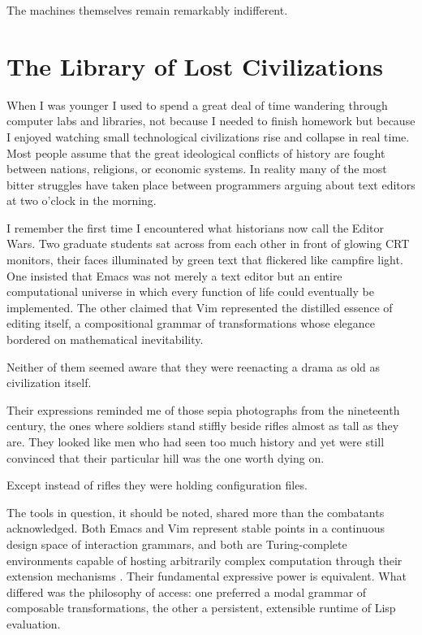 \documentclass[12pt]{article}
\theoremstyle{definition}
\begin{document}
The machines themselves remain remarkably indifferent.

\section{The Library of Lost Civilizations}

When I was younger I used to spend a great deal of time wandering through
computer labs and libraries, not because I needed to finish homework but
because I enjoyed watching small technological civilizations rise and
collapse in real time. Most people assume that the great ideological
conflicts of history are fought between nations, religions, or economic
systems. In reality many of the most bitter struggles have taken place
between programmers arguing about text editors at two o'clock in the
morning.

I remember the first time I encountered what historians now call the
Editor Wars. Two graduate students sat across from each other in front
of glowing CRT monitors, their faces illuminated by green text that
flickered like campfire light. One insisted that Emacs was not merely a
text editor but an entire computational universe in which every function
of life could eventually be implemented. The other claimed that Vim
represented the distilled essence of editing itself, a compositional
grammar of transformations whose elegance bordered on mathematical
inevitability.

Neither of them seemed aware that they were reenacting a drama as old as
civilization itself.

Their expressions reminded me of those sepia photographs from the
nineteenth century, the ones where soldiers stand stiffly beside rifles
almost as tall as they are. They looked like men who had seen too much
history and yet were still convinced that their particular hill was the
one worth dying on.

Except instead of rifles they were holding configuration files.

The tools in question, it should be noted, shared more than the combatants
acknowledged. Both Emacs and Vim represent stable points in a continuous
design space of interaction grammars, and both are Turing-complete
environments capable of hosting arbitrarily complex computation through
their extension mechanisms \cite{stallman2002,raymond2003}. Their
fundamental expressive power is equivalent. What differed was the
philosophy of access: one preferred a modal grammar of composable
transformations, the other a persistent, extensible runtime of Lisp
evaluation.
\end{document}
